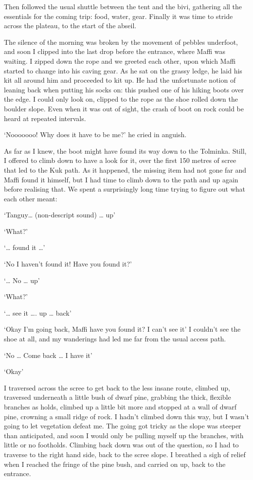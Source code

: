 Then followed the usual shuttle between the tent and the bivi, gathering all the essentials for the coming trip: food, water, gear. Finally it was time to stride across the plateau, to the start of the abseil. 

The silence of the morning was broken by the movement of pebbles underfoot, and soon I clipped into the last drop before the entrance, where Maffi was waiting. I zipped down the rope and we greeted each other, upon which Maffi started to change into his caving gear. As he sat on the grassy ledge, he laid his kit all around him and proceeded to kit up. He had the unfortunate notion of leaning back when putting his socks on: this pushed one of his hiking boots over the edge. I could only look on, clipped to the rope as the shoe rolled down the boulder slope. Even when it was out of sight, the crash of boot on rock could be heard at repeated intervals. 

‘Nooooooo! Why does it have to be me?’ he cried in anguish. 

As far as I knew, the boot might have found its way down to the Tolminka. Still, I offered to climb down to have a look for it, over the first 150 metres of scree that led to the Kuk path. As it happened, the missing item had not gone far and Maffi found it himself, but I had time to climb down to the path and up again before realising that. We spent a surprisingly long time trying to figure out what each other meant: 

‘Tanguy… (non-descript sound) …  up’ 

‘What?’ 

‘… found it …’ 

‘No I haven’t found it! Have you found it?’ 

 ‘… No … up’  
 
‘What?’ 

‘… see it …. up … back’ 

‘Okay I’m going back, Maffi have you found it? I can’t see it’  I couldn’t see the shoe at all, and my wanderings had led me far from the usual access path.

‘No … Come back … I have it’

‘Okay’

I traversed across the scree to get back to the less insane route, climbed up, traversed underneath a little bush of dwarf pine, grabbing the thick, flexible branches as holds, climbed up a little bit more and stopped at a wall of dwarf pine, crowning a small ridge of rock. I hadn’t climbed down this way, but I wasn’t going to let vegetation defeat me. The going got tricky as the slope was steeper than anticipated, and soon I would only be pulling myself up the branches, with little or no footholds. Climbing back down was out of the question, so I had to traverse to the right  hand side, back to the scree slope. I breathed a sigh of relief when I reached the fringe of the pine bush, and carried on up, back to the entrance. 


